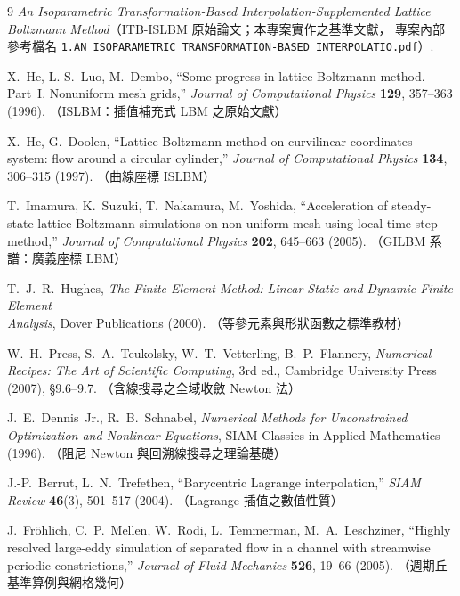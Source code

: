 \documentclass[11pt,a4paper]{article}
\newcommand{\code}[1]{\texttt{#1}}
\begin{document}
\begin{thebibliography}{9}
\emph{An Isoparametric Transformation-Based Interpolation-Supplemented
Lattice Boltzmann Method}（ITB-ISLBM 原始論文；本專案實作之基準文獻，
專案內部參考檔名 \code{1.AN\_ISOPARAMETRIC\_TRANSFORMATION-BASED\_INTERPOLATIO.pdf}）.

X.~He, L.-S.~Luo, M.~Dembo,
``Some progress in lattice Boltzmann method. Part~I. Nonuniform mesh grids,''
\emph{Journal of Computational Physics} \textbf{129}, 357--363 (1996).
（ISLBM：插值補充式 LBM 之原始文獻）

X.~He, G.~Doolen,
``Lattice Boltzmann method on curvilinear coordinates system:
flow around a circular cylinder,''
\emph{Journal of Computational Physics} \textbf{134}, 306--315 (1997).
（曲線座標 ISLBM）

T.~Imamura, K.~Suzuki, T.~Nakamura, M.~Yoshida,
``Acceleration of steady-state lattice Boltzmann simulations on
non-uniform mesh using local time step method,''
\emph{Journal of Computational Physics} \textbf{202}, 645--663 (2005).
（GILBM 系譜：廣義座標 LBM）

T.~J.~R.~Hughes,
\emph{The Finite Element Method: Linear Static and Dynamic Finite
Element Analysis}, Dover Publications (2000).
（等參元素與形狀函數之標準教材）

W.~H.~Press, S.~A.~Teukolsky, W.~T.~Vetterling, B.~P.~Flannery,
\emph{Numerical Recipes: The Art of Scientific Computing}, 3rd ed.,
Cambridge University Press (2007), \S9.6--9.7.
（含線搜尋之全域收斂 Newton 法）

J.~E.~Dennis~Jr., R.~B.~Schnabel,
\emph{Numerical Methods for Unconstrained Optimization and Nonlinear
Equations}, SIAM Classics in Applied Mathematics (1996).
（阻尼 Newton 與回溯線搜尋之理論基礎）

J.-P.~Berrut, L.~N.~Trefethen,
``Barycentric Lagrange interpolation,''
\emph{SIAM Review} \textbf{46}(3), 501--517 (2004).
（Lagrange 插值之數值性質）

J.~Fr\"ohlich, C.~P.~Mellen, W.~Rodi, L.~Temmerman, M.~A.~Leschziner,
``Highly resolved large-eddy simulation of separated flow in a channel
with streamwise periodic constrictions,''
\emph{Journal of Fluid Mechanics} \textbf{526}, 19--66 (2005).
（週期丘基準算例與網格幾何）
\end{thebibliography}
\end{document}
